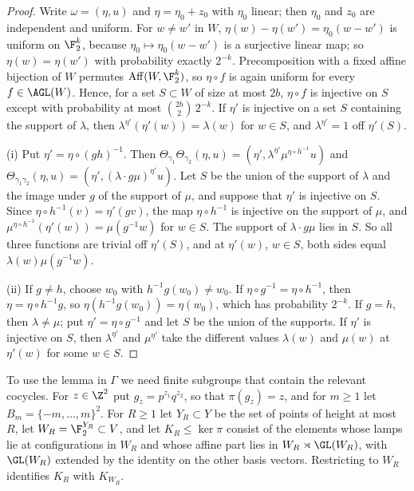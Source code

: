 \begin{proof}
Write $\omega=(\eta,u)$ and $\eta=\eta_0+z_0$ with $\eta_0$ linear; then $\eta_0$ and $z_0$ are independent and uniform. For $w\ne w'$ in $W$,
$\eta(w)-\eta(w')=\eta_0(w-w')$ is uniform on $\F_2^k$, because $\eta_0\mapsto\eta_0(w-w')$ is a surjective linear map; so
$\eta(w)=\eta(w')$ with probability exactly $2^{-k}$. Precomposition with a fixed affine bijection of $W$ permutes $\operatorname{Aff}(W,\F_2^k)$, so
$\eta\circ f$ is again uniform for every $f\in\AGL(W)$. Hence, for a set $S\subset W$ of size at most $2b$, $\eta\circ f$ is injective on $S$ except
with probability at most $\binom{2b}2\,2^{-k}$. If $\eta'$ is injective on a set $S$ containing the support of $\lambda$, then
$\lambda^{\eta'}(\eta'(w))=\lambda(w)$ for $w\in S$, and $\lambda^{\eta'}=1$ off $\eta'(S)$.

(i) Put $\eta'=\eta\circ(gh)^{-1}$. Then $\Theta_{\gamma_1}\Theta_{\gamma_2}(\eta,u)=(\eta',\lambda^{\eta'}\mu^{\eta\circ h^{-1}}u)$ and
$\Theta_{\gamma_1\gamma_2}(\eta,u)=(\eta',(\lambda\cdot g\mu)^{\eta'}u)$. Let $S$ be the union of the support of $\lambda$ and the image under $g$ of
the support of $\mu$, and suppose that $\eta'$ is injective on $S$. Since $\eta\circ h^{-1}(v)=\eta'(gv)$, the map $\eta\circ h^{-1}$ is injective on
the support of $\mu$, and $\mu^{\eta\circ h^{-1}}(\eta'(w))=\mu(g^{-1}w)$ for $w\in S$. The support of $\lambda\cdot g\mu$ lies in $S$. So all three
functions are trivial off $\eta'(S)$, and at $\eta'(w)$, $w\in S$, both sides equal $\lambda(w)\mu(g^{-1}w)$.

(ii) If $g\ne h$, choose $w_0$ with $h^{-1}g(w_0)\ne w_0$. If $\eta\circ g^{-1}=\eta\circ h^{-1}$, then $\eta=\eta\circ h^{-1}g$, so
$\eta(h^{-1}g(w_0))=\eta(w_0)$, which has probability $2^{-k}$. If $g=h$, then $\lambda\ne\mu$; put $\eta'=\eta\circ g^{-1}$ and let $S$ be the union
of the supports. If $\eta'$ is injective on $S$, then $\lambda^{\eta'}$ and $\mu^{\eta'}$ take the different values $\lambda(w)$ and $\mu(w)$ at
$\eta'(w)$ for some $w\in S$.
\end{proof}

To use the lemma in $\Gamma$ we need finite subgroups that contain the relevant cocycles. For $z\in\Z^2$ put $g_z=p^{z_1}q^{z_2}$, so that
$\pi(g_z)=z$, and for $m\ge1$ let $B_m=\{-m,\dots,m\}^2$. For $R\ge1$ let $Y_R\subset Y$ be the set of points of height at most $R$, let
$W_R=\F_2^{Y_R}\subset V$, and let $K_R\le\ker\pi$ consist of the elements whose lamps lie at configurations in $W_R$ and whose affine part lies in
$W_R\rtimes\GL(W_R)$, with $\GL(W_R)$ extended by the identity on the other basis vectors. Restricting to $W_R$ identifies $K_R$ with $K_{W_R}$.

